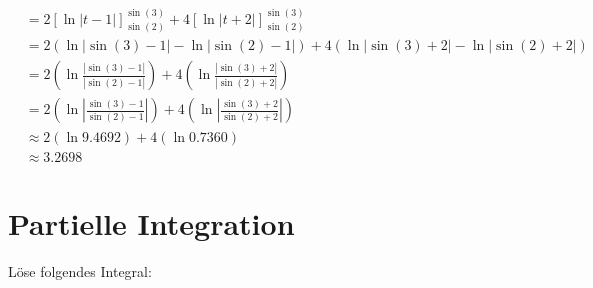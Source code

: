 \documentclass[11pt, a4paper]{article}
\providecommand{\abs}[1]{\left\lvert#1\right\rvert}
\begin{document}
\begin{align*}
	 &= 2 \left[ \ln\abs{t-1} \right]_{\sin(2)}^{\sin(3)} + 4 \left[ \ln\abs{t+2} \right]_{\sin(2)}^{\sin(3)} \\
	 &= 2 \left( \ln\abs{\sin(3)-1} - \ln\abs{\sin(2)-1} \right) + 4 \left( \ln\abs{\sin(3) + 2} - \ln\abs{\sin(2) + 2} \right) \\
	 &= 2 \left( \ln \frac{\abs{\sin(3)-1}}{\abs{\sin(2)-1}} \right) + 4 \left( \ln \frac{\abs{\sin(3) + 2}}{\abs{\sin(2) + 2}} \right) \\
	 &= 2 \left( \ln \abs{\frac{\sin(3)-1}{\sin(2)-1}} \right) + 4 \left( \ln \abs{\frac{\sin(3) + 2}{\sin(2) + 2}} \right) \\
	 &\approx 2 \left( \ln 9.4692 \right) + 4 \left( \ln 0.7360 \right) \\
	 &\approx 3.2698
\end{align*}

\newpage
\section{Partielle Integration}

Löse folgendes Integral:

\newcommand{\lowerBorder}{{0}}
\newcommand{\upperBorder}{{\frac{1}{3}}}
\end{document}
